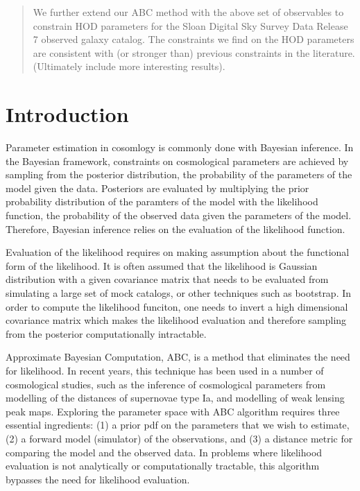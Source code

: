 \documentclass[12pt, preprint]{aastex}
\begin{document}
\begin{abstract}
We further extend our ABC method with the above set of observables to constrain HOD parameters for the Sloan 
Digital Sky Survey Data Release 7 observed galaxy catalog. The constraints we find on the HOD parameters are consistent with 
(or stronger than) previous constraints in the literature. (Ultimately include more interesting results).

\end{abstract}

\section{Introduction}

Parameter estimation in cosomlogy is commonly done with Bayesian inference. 
In the Bayesian framework, constraints on cosmological parameters are achieved by 
sampling from the posterior distribution, the probability of the parameters of the 
model given the data. Posteriors are evaluated by multiplying the prior probability 
distribution of the paramters of the model with the likelihood function, the probability 
of the observed data given the parameters of the model.
Therefore, Bayesian inference relies on the evaluation of the likelihood function.
 
Evaluation of the likelihood requires on making assumption about the functional 
form of the likelihood. It is often assumed that the likelihood is Gaussian distribution 
with a given covariance matrix that needs to be evaluated from simulating a large set of 
mock catalogs, or other techniques such as bootstrap. In order to 
compute the likelihood funciton, one needs to invert a high dimensional covariance 
matrix which makes the likelihood evaluation and therefore sampling from the posterior 
computationally intractable.

Approximate Bayesian Computation, ABC, is a method that eliminates the need for likelihood. 
In recent years, this technique has been used in a number of cosmological studies, such as 
the inference of cosmological parameters from modelling of the distances of supernovae type Ia, 
and modelling of weak lensing peak maps. Exploring the parameter space with ABC algorithm 
requires three essential ingredients: (1) a prior pdf on the parameters that we wish to estimate, 
(2) a forward model (simulator) of the observations, and (3) a distance metric for comparing 
the model and the observed data. In problems where likelihood evaluation is not analytically or 
computationally tractable, this algorithm bypasses the need for likelihood evaluation.
\end{document}
